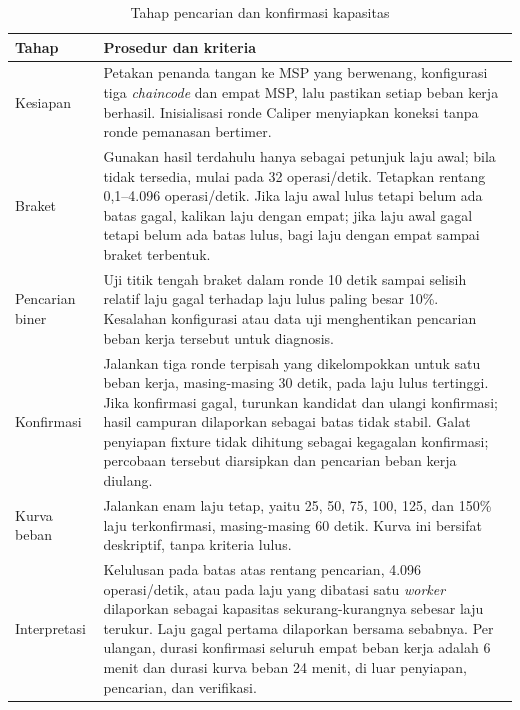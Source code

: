 \begingroup
\renewcommand{\arraystretch}{1.3}
\begin{table}[H]
	\caption{Tahap pencarian dan konfirmasi kapasitas}
	\label{tab:skenario}
	\centering
	\begin{tabular}{p{2.7cm} p{10cm}}
	\toprule
	\textbf{Tahap} & \textbf{Prosedur dan kriteria} \\
	\midrule
	Kesiapan & Petakan penanda tangan ke MSP yang berwenang, konfigurasi tiga \textit{chaincode} dan empat MSP, lalu pastikan setiap beban kerja berhasil. Inisialisasi ronde Caliper menyiapkan koneksi tanpa ronde pemanasan bertimer. \\
	Braket & Gunakan hasil terdahulu hanya sebagai petunjuk laju awal; bila tidak tersedia, mulai pada 32 operasi/detik. Tetapkan rentang 0,1--4.096 operasi/detik. Jika laju awal lulus tetapi belum ada batas gagal, kalikan laju dengan empat; jika laju awal gagal tetapi belum ada batas lulus, bagi laju dengan empat sampai braket terbentuk. \\
	Pencarian biner & Uji titik tengah braket dalam ronde 10 detik sampai selisih relatif laju gagal terhadap laju lulus paling besar 10\%. Kesalahan konfigurasi atau data uji menghentikan pencarian beban kerja tersebut untuk diagnosis. \\
	Konfirmasi & Jalankan tiga ronde terpisah yang dikelompokkan untuk satu beban kerja, masing-masing 30 detik, pada laju lulus tertinggi. Jika konfirmasi gagal, turunkan kandidat dan ulangi konfirmasi; hasil campuran dilaporkan sebagai batas tidak stabil. Galat penyiapan fixture tidak dihitung sebagai kegagalan konfirmasi; percobaan tersebut diarsipkan dan pencarian beban kerja diulang. \\
	Kurva beban & Jalankan enam laju tetap, yaitu 25, 50, 75, 100, 125, dan 150\% laju terkonfirmasi, masing-masing 60 detik. Kurva ini bersifat deskriptif, tanpa kriteria lulus. \\
	Interpretasi & Kelulusan pada batas atas rentang pencarian, 4.096 operasi/detik, atau pada laju yang dibatasi satu \textit{worker} dilaporkan sebagai kapasitas sekurang-kurangnya sebesar laju terukur. Laju gagal pertama dilaporkan bersama sebabnya. Per ulangan, durasi konfirmasi seluruh empat beban kerja adalah 6 menit dan durasi kurva beban 24 menit, di luar penyiapan, pencarian, dan verifikasi. \\
	\bottomrule
	\end{tabular}
\end{table}
\endgroup

